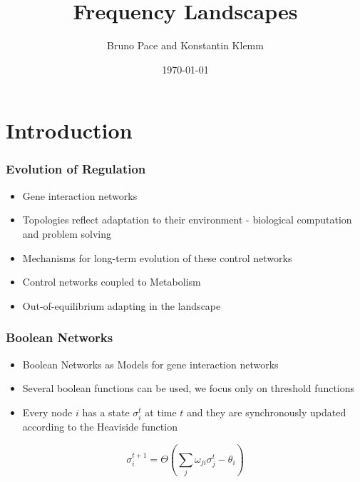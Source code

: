 \documentclass{beamer}
\begin{document}
\title{Frequency Landscapes}  
\author{Bruno Pace and Konstantin Klemm}
\date{\today} 
\begin{frame}
\titlepage
\end{frame}



\section{Introduction} 
\begin{frame}\frametitle{Evolution of Regulation}
\begin{itemize}
 \item Gene interaction networks
 \item Topologies reflect adaptation to their environment - biological computation and problem solving
 \item Mechanisms for long-term evolution of these control networks 
 \item Control networks coupled to Metabolism
 \item Out-of-equilibrium adapting in the landscape
\end{itemize}

\end{frame}



\begin{frame}\frametitle{Boolean Networks} 
\begin{itemize}
\item Boolean Networks as Models for gene interaction networks
\item Several boolean functions can be used, we focus only on threshold functions
\item Every node $i$ has a state $\sigma_i^t$ at time $t$ and they are synchronously updated according to the Heaviside function
\end{itemize} 
\begin{equation}
\sigma_i^{t+1} = \Theta(\sum_{j}\omega_{ji}\sigma_j^t - \theta_i)
\end{equation}
\end{frame}
\end{document}
